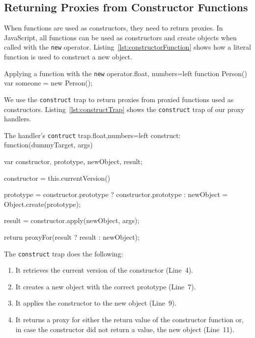 \subsection{Returning Proxies from Constructor Functions} 

When functions are used as constructors, they need to return proxies.
In JavaScript, all functions can be used as constructors and create objects when called with the \lstinline{new} operator.
Listing~\ref{lst:constructorFunction} shows how a literal function is used to construct a new object.

\begin{code}{Applying a function with the \lstinline{new} operator.}{float, numbers=left}
function Person() {}
var someone = new Person();
\end{code}
\iffalse
\end{verbatim}\fi

We use the \lstinline{construct} trap to return proxies from proxied functions used as constructors.
Listing~\ref{lst:constructTrap} shows the \lstinline{construct} trap of our proxy handlers.

\begin{code}{The handler's \lstinline{contruct} trap.}{float,numbers=left}
construct: function(dummyTarget, args) {
    var constructor, prototype, newObject, result;
    
    constructor = this.currentVersion()
    
    prototype = constructor.prototype ? constructor.prototype : {}    
    newObject = Object.create(prototype);
    
    result = constructor.apply(newObject, args);
    
    return proxyFor(result ? result : newObject);
}
\end{code}
\iffalse
\end{verbatim}\fi

The \lstinline{construct} trap does the following:
\begin{enumerate}
    \item It retrieves the current version of the constructor (Line~4).
    \item It creates a new object with the correct prototype (Line~7).
    \item It applies the constructor to the new object (Line~9).
    \item It returns a proxy for either the return value of the constructor function or, in case the constructor did not return a value, the new object (Line~11).
\end{enumerate}

